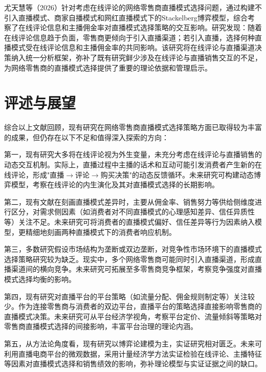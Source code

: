 \documentclass[12pt,a4paper]{article}
\begin{document}
尤天慧等（2026）针对考虑在线评论的网络零售商直播模式选择问题，通过构建不引入直播模式、商家自播模式和网红直播模式下的Stackelberg博弈模型，综合考察了在线评论信息和主播佣金率对直播模式选择策略的交互影响\cite{you2026}。研究发现：随着在线评论信息趋于负面，零售商更倾向于引入直播渠道；若引入直播，选择何种直播模式受在线评论信息和主播佣金率的共同影响。该研究将在线评论与直播渠道决策纳入统一分析框架，弥补了既有研究鲜少涉及在线评论与直播销售交互的不足，为网络零售商的直播模式选择提供了重要的理论依据和管理启示。

\section{评述与展望}

综合以上文献回顾，现有研究在网络零售商直播模式选择策略方面已取得较为丰富的成果，但仍存在以下不足和值得深入探索的方向：

第一，现有研究大多将在线评论视为外生变量，未充分考虑在线评论与直播销售的动态交互机制。实际上，直播过程中主播的话术和互动可能引发消费者产生新的在线评论，形成"直播$\rightarrow$评论$\rightarrow$购买决策"的动态反馈循环。未来研究可构建动态博弈模型，考察在线评论的内生演化及其对直播模式选择的长期影响。

第二，现有文献在刻画直播模式差异时，主要从佣金率、销售努力等供给侧维度进行区分，对需求侧因素（如消费者对不同直播模式的心理感知差异、信任异质性等）关注不足。未来研究可将消费者的直播模式偏好、信任差异等行为因素纳入模型，更精细地刻画两种直播模式下的消费者响应机制。

第三，多数研究假设市场结构为垄断或双边垄断，对竞争性市场环境下的直播模式选择策略研究较为缺乏。现实中，多个网络零售商可能同时引入直播渠道，形成直播渠道间的横向竞争。未来研究可拓展至多零售商竞争框架，考察竞争强度对直播模式选择均衡的影响。

第四，现有研究对直播平台的平台策略（如流量分配、佣金规则制定等）关注较少。作为连接零售商与消费者的双边平台，直播平台的策略选择直接影响零售商的直播模式决策。未来研究可从平台经济学视角，考察平台定价、流量倾斜等策略对零售商直播模式选择的间接影响，丰富平台治理的理论内涵。

第五，从方法论角度看，现有研究以博弈论建模为主，实证研究相对匮乏。未来可利用直播电商平台的微观数据，采用计量经济学方法实证检验在线评论、主播特征等因素对直播模式选择和销售绩效的影响，弥补理论模型与实证证据之间的缺口。
\end{document}
